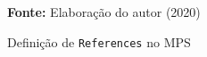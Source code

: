 \begin{figure}[ht!]
\centering

\caption{\textmd{Definição de \texttt{References} no \gls{MPS}}}
\label{fig:references}

\par\medskip\textbf{Fonte:} Elaboração do autor (2020) \par\medskip

\end{figure}

